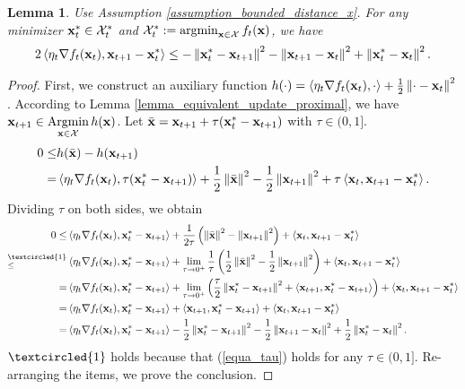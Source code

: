 \documentclass{article}
\newtheorem{Lemma}{\bf{Lemma}}
\begin{document}
\begin{Lemma}
\label{lemma_I1_before} 
Use Assumption \ref{assumption_bounded_distance_x}.
For any minimizer ${\bf x}_t^{\ast} \in {\mathcal{X}}_t^{\ast}$ and $\Xcal_t^{\ast} :=  \argmin_{\x\in\Xcal} f_t(\x)$, we have 
\begin{align}
\label{equa_lemma_I1_before}
2\left\langle\eta_t \nabla f_t({\bf x}_t),  
{\bf x}_{t+1} - {\bf x}_t^{\ast} \right\rangle \le   -\left\lVert{\bf x}_t^{\ast} - {\bf x}_{t+1}\right\rVert^2 - \left\lVert{\bf x}_{t+1} - {\bf x}_t\right\rVert^2  + \left\lVert {\bf x}_t^{\ast} - {\bf x}_t \right\rVert^2.
\end{align}
\end{Lemma}
\begin{proof}
First, we construct an auxiliary function $h(\cdot )  = \left\langle\eta_t \nabla f_t({\bf x}_t), \cdot \right\rangle + \frac{1}{2}\left\lVert\cdot - {\bf x}_t\right\rVert^2$. According to Lemma \ref{lemma_equivalent_update_proximal}, we have $\x_{t+1} \in \Argmin\limits_{\x\in \Xcal} h(\x)$. Let $\bar{{\bf x}} = {\bf x}_{t+1} + \tau ({\bf x}_t^{\ast} - {\bf x}_{t+1})$ with $\tau\in (0,1]$. 
\begin{align}
\nonumber
0 \le & h(\bar{{\bf x}}) - h({\bf x}_{t+1}) \\ \label{equa_tau}
= & \left\langle\eta_t \nabla f_t({\bf x}_t), \tau ({\bf x}_t^{\ast} - 
{\bf x}_{t+1}) \right\rangle + \frac{1}{2}\left\lVert\bar{{\bf x}}\right\rVert^2 - \frac{1}{2}\left\lVert{\bf x}_{t+1}\right\rVert^2  + \tau \left\langle{\bf x}_t, {\bf x}_{t+1} - {\bf x}_t^{\ast} \right\rangle.
\end{align}  Dividing $\tau$ on both sides, we obtain
\begin{align}
\nonumber
0 \le &  \lrangle {\eta_t \nabla f_t(\x_t), \x_t^{\ast} - 
\x_{t+1}} + \frac{1}{2\tau}\left (\lrnorm{\bar{\x}}^2 - \lrnorm {\x_{t+1}}^2\right)  + \lrangle {\x_t, \x_{t+1} - \x_t^{\ast}}\\ \nonumber
\refabovecir{\le}{\textcircled{1}} & \lrangle {\eta_t \nabla f_t(\x_t), \x_t^{\ast} - 
\x_{t+1}}  + \lim_{\tau\rightarrow 0^{+}}\frac{1}{\tau}\left (\frac{1}{2}\lrnorm{\bar{\x}}^2 - \frac{1}{2}\lrnorm {\x_{t+1}}^2\right) + \lrangle {\x_t, \x_{t+1} - \x_t^{\ast}}\\ \nonumber
= & \lrangle {\eta_t \nabla f_t(\x_t), \x_t^{\ast} - 
\x_{t+1}}  + \lim_{\tau\rightarrow 0^{+}}\lrincir{ \frac{\tau}{2}\lrnorm{\x_t^{\ast} - \x_{t+1}}^2 + \lrangle{ \x_{t+1}, \x_t^\ast - \x_{t+1} } }  + \lrangle {\x_t, \x_{t+1} - \x_t^{\ast}}\\ \nonumber
= & \lrangle {\eta_t \nabla f_t(\x_t), \x_t^{\ast} - 
\x_{t+1}} + \lrangle{\x_{t+1}, \x_t^{\ast} - \x_{t+1}}  + \lrangle {\x_t, \x_{t+1} - \x_t^{\ast}}\\ \nonumber
= & \lrangle {\eta_t \nabla f_t(\x_t), \x_t^{\ast} - 
\x_{t+1}} - \frac{1}{2} \lrnorm{\x_t^{\ast} - \x_{t+1}}^2  - \frac{1}{2}\lrnorm{\x_{t+1} - \x_t}^2  + \frac{1}{2}\lrnorm { \x_t^{\ast} - \x_t }^2.
\end{align} $\textcircled{1}$ holds because that  (\ref{equa_tau}) holds for any $\tau \in (0,1]$. 
 Re-arranging the items, we prove the conclusion.
\end{proof}
\end{document}
